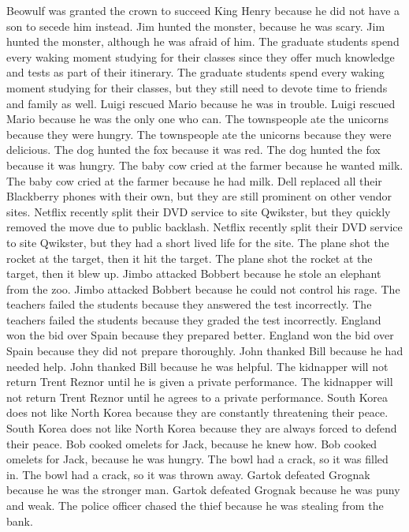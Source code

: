 \documentclass{article}
\begin{document}
\begin{enumerate}
	Beowulf was granted the crown to succeed King Henry because he did not have a son to secede him instead.
	Jim hunted the monster, because he was scary.
	Jim hunted the monster, although he was afraid of him.
	The graduate students spend every waking moment studying for their classes since they offer much knowledge and tests as part of their itinerary.
	The graduate students spend every waking moment studying for their classes, but they still need to devote time to friends and family as well.
	Luigi rescued Mario because he was in trouble.
	Luigi rescued Mario because he was the only one who can.
	The townspeople ate the unicorns because they were hungry.
	The townspeople ate the unicorns because they were delicious.
	The dog hunted the fox because it was red.
	The dog hunted the fox because it was hungry.
	The baby cow cried at the farmer because he wanted milk.
	The baby cow cried at the farmer because he had milk.
	Dell replaced all their Blackberry phones with their own, but they are still prominent on other vendor sites.
	Netflix recently split their DVD service to site Qwikster, but they quickly removed the move due to public backlash.
	Netflix recently split their DVD service to site Qwikster, but they had a short lived life for the site.
	The plane shot the rocket at the target, then it hit the target.
	The plane shot the rocket at the target, then it blew up.
	Jimbo attacked Bobbert because he stole an elephant from the zoo.
	Jimbo attacked Bobbert because he could not control his rage.
	The teachers failed the students because they answered the test incorrectly.
	The teachers failed the students because they graded the test incorrectly.
	England won the bid over Spain because they prepared better.
	England won the bid over Spain because they did not prepare thoroughly.
	John thanked Bill because he had needed help.
	John thanked Bill because he was helpful.
	The kidnapper will not return Trent Reznor until he is given a private performance.
	The kidnapper will not return Trent Reznor until he agrees to a private performance.
	South Korea does not like North Korea because they are constantly threatening their peace.
	South Korea does not like North Korea because they are always forced to defend their peace.
	Bob cooked omelets for Jack, because he knew how.
	Bob cooked omelets for Jack, because he was hungry.
	The bowl had a crack, so it was filled in.
	The bowl had a crack, so it was thrown away.
	Gartok defeated Grognak because he was the stronger man.
	Gartok defeated Grognak because he was puny and weak.
	The police officer chased the thief because he was stealing from the bank.

\end{enumerate}
\end{document}
